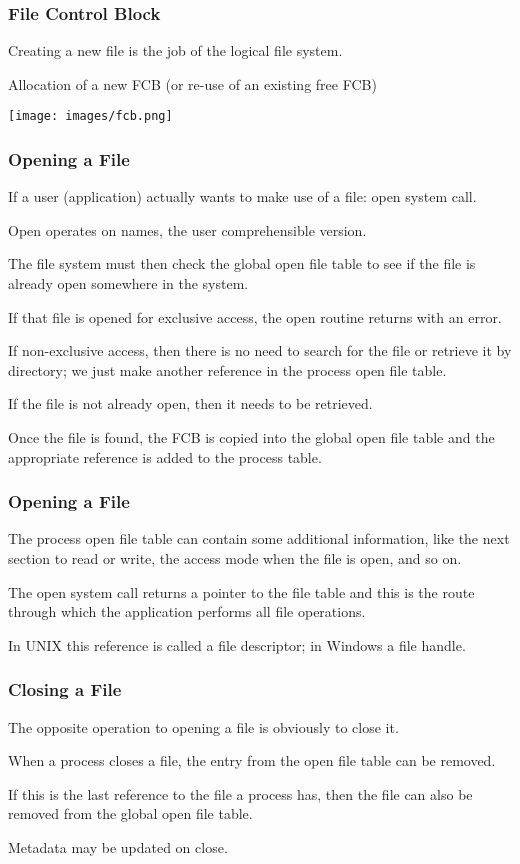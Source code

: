 \begin{frame}
\frametitle{File Control Block}

Creating a new file is the job of the logical file system. 

Allocation of a new FCB (or re-use of an existing free FCB)

\begin{center}
	\texttt{[image: images/fcb.png]}
\end{center}

\end{frame}

\begin{frame}
\frametitle{Opening a File}

If a user (application) actually wants to make use of a file: open system call. 

Open operates on names, the user comprehensible version. 

The file system must then check the global open file table to see if the file is already open somewhere in the system. 

If that file is opened for exclusive access, the open routine returns with an error. 

If non-exclusive access, then there is no need to search for the file or retrieve it by directory; we just make another reference in the process open file table. 

If the file is not already open, then it needs to be retrieved. 

Once the file is found, the FCB is copied into the global open file table and the appropriate reference is added to the process table.

\end{frame}

\begin{frame}
\frametitle{Opening a File}

The process open file table can contain some additional information, like the next section to read or write, the access mode when the file is open, and so on. 

The open system call returns a pointer to the file table and this is the route through which the application performs all file operations. 

In UNIX this reference is called a \alert{file descriptor}; in Windows a \alert{file handle}.


\end{frame}

\begin{frame}
\frametitle{Closing a File}

The opposite operation to opening a file is obviously to close it. 

When a process closes a file, the entry from the open file table can be removed. 

If this is the last reference to the file a process has, then the file can also be removed from the global open file table. 

Metadata may be updated on close.

\end{frame}



